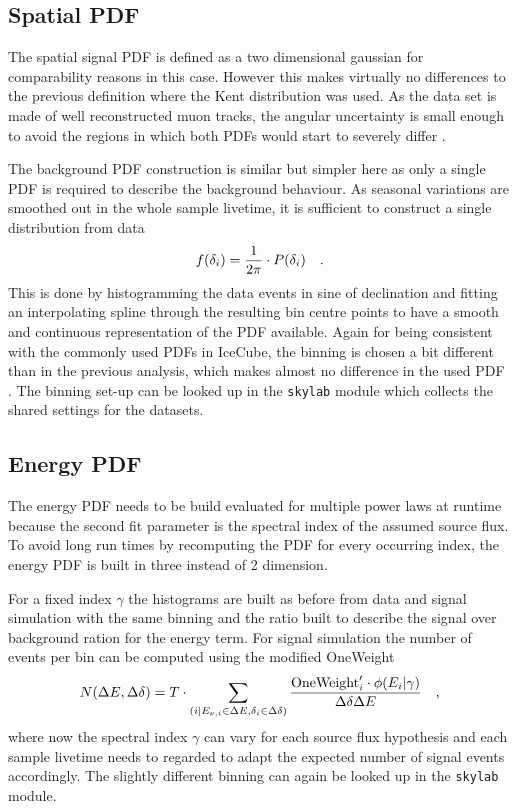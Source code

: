 \subsection*{Spatial PDF}
The spatial signal PDF is defined as a two dimensional gaussian for comparability reasons in this case.
However this makes virtually no differences to the previous definition where the Kent distribution was used.
As the data set is made of well reconstructed muon tracks, the angular uncertainty is small enough to avoid the regions in which both PDFs would start to severely differ .

The background PDF construction is similar but simpler here as only a single PDF is required to describe the background behaviour.
As seasonal variations are smoothed out in the whole sample livetime, it is sufficient to construct a single distribution from data
\begin{equation}
  f(\delta_i) = \frac{1}{2\pi}\cdot P(\delta_i)
  \quad\text{.}
\end{equation}
This is done by histogramming the data events in sine of declination and fitting an interpolating spline through the resulting bin centre points to have a smooth and continuous representation of the PDF available.
Again for being consistent with the commonly used PDFs in IceCube, the binning is chosen a bit different than in the previous analysis, which makes almost no difference in the used PDF .
The binning set-up can be looked up in the \lstinline!skylab!  module which collects the shared settings for the datasets.

\subsection*{Energy PDF}
The energy PDF needs to be build evaluated for multiple power laws at runtime because the second fit parameter is the spectral index of the assumed source flux.
To avoid long run times by recomputing the PDF for every occurring index, the energy PDF is built in three instead of 2 dimension.

For a fixed index $\gamma$ the histograms are built as before from data and signal simulation with the same binning and the ratio built to describe the signal over background ration for the energy term.
For signal simulation the number of events per bin can be computed using the modified OneWeight
\begin{equation}
  N(\Delta E, \Delta\delta)
  = T\cdot \sum_{(i|E_{\nu,i}\in\Delta E, \delta_i\in\Delta\delta)}
    \frac{\text{OneWeight}'_i \cdot \phi(E_i|\gamma)}{\Delta\delta \Delta E}
  \quad\text{,}
\end{equation}
where now the spectral index $\gamma$ can vary for each source flux hypothesis and each sample livetime needs to regarded to adapt the expected number of signal events accordingly.
The slightly different binning can again be looked up in the \lstinline!skylab! module.


